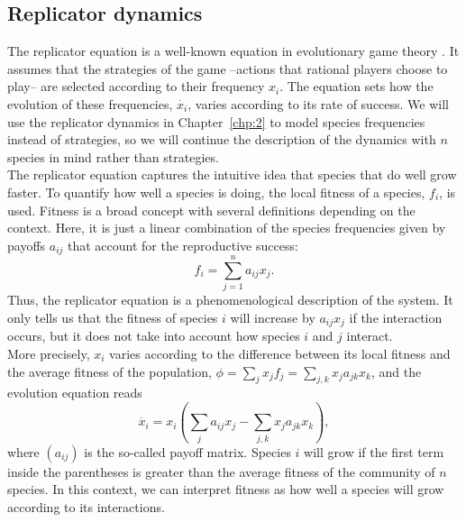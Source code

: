 \subsection{Replicator dynamics}\label{chp:methods:repli}
 The replicator equation is a well-known equation in evolutionary game theory \cite{houfbauer1998book}. It assumes that the strategies of the game --actions that rational players choose to play-- are selected according to their frequency $x_i$. The equation sets how the evolution of these frequencies, $\dot{x_i}$, varies according to its rate of success. We will use the replicator dynamics in Chapter~\ref{chp:2} to model species frequencies instead of strategies, so we will continue the description of the dynamics with $n$ species in mind rather than strategies. \\
 
The replicator equation captures the intuitive idea that species that do well grow faster. To quantify how well a species is doing, the local fitness of a species, $f_i$, is used. Fitness is a broad concept with several definitions depending on the context. Here, it is just a linear combination of the species frequencies given by payoffs $a_{ij}$ that account for the reproductive success:
\begin{equation}
    f_i = \sum_{j = 1}^{n}  a_{ij} x_j.
\end{equation}\label{eq:localfitness}
 Thus, the replicator equation is a phenomenological description of the system. It only tells us that the fitness of species $i$ will increase by $a_{ij} x_j$ if the interaction occurs, but it does not take into account how species $i$ and $j$ interact. \\
 
 More precisely, $x_i$ varies according to the difference between its local fitness and the average fitness of the population,  $ \phi = \sum_{j} x_j f_j = \sum_{j,k} x_j a_{jk} x_k$, and the evolution equation reads
 \begin{equation}
    \dot{x_i} = x_i \left( \sum_j a_{ij} x_j - \sum_{j,k} x_j a_{jk} x_k \right),
    \label{chp:methods:eq:replicator}
\end{equation}
 where $(a_{ij})$ is the so-called payoff matrix. Species $i$ will grow if the first term inside the parentheses is greater than the average fitness of the community of $n$ species. In this context, we can interpret fitness as how well a species will grow according to its interactions. \\
 
